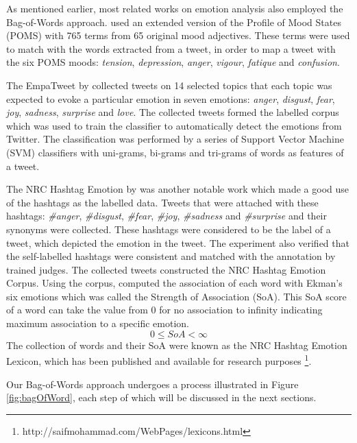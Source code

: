 As mentioned earlier, most related works on emotion analysis also employed the Bag-of-Words approach. \citet{bollen2009modeling} used an extended version of the Profile of Mood States (POMS) with 765 terms from 65 original mood adjectives. These terms were used to match with the words extracted from a tweet, in order to map a tweet with the six POMS moods: \textit{tension}, \textit{depression}, \textit{anger}, \textit{vigour}, \textit{fatique} and \textit{confusion}.

The EmpaTweet by \citet{roberts2012empatweet} collected tweets on 14 selected topics that each topic was expected to evoke a particular emotion in seven emotions: \textit{anger}, \textit{disgust}, \textit{fear}, \textit{joy}, \textit{sadness}, \textit{surprise} and \textit{love}. The collected tweets formed the labelled corpus which was used to train the classifier to automatically detect the emotions from Twitter. The classification was performed by a series of Support Vector Machine (SVM) classifiers with uni-grams, bi-grams and tri-grams of words as features of a tweet.

The NRC Hashtag Emotion by \citep{mohammad2014using} was another notable work which made a good use of the hashtags as the labelled data. Tweets that were attached with these hashtags: \textit{\#anger}, \textit{\#disgust}, \textit{\#fear}, \textit{\#joy}, \textit{\#sadness} and \textit{\#surprise} and their synonyms were collected. These hashtags were considered to be the label of a tweet, which depicted the emotion in the tweet. The experiment also verified that the self-labelled hashtags were consistent and matched with the annotation by trained judges. The collected tweets constructed the NRC Hashtag Emotion Corpus. Using the corpus, \citet{mohammad2014using} computed the association of each word with Ekman's six emotions which was called the Strength of Association (SoA). This SoA score of a word can take the value from 0 for no association to infinity indicating maximum association to a specific emotion.
\begin{equation}
	0 \leq SoA < \infty
\end{equation}
The collection of words and their SoA were known as the NRC Hashtag Emotion Lexicon, which has been published and available for research purposes \footnote{http://saifmohammad.com/WebPages/lexicons.html}. 

Our Bag-of-Words approach undergoes a process illustrated in Figure \ref{fig:bagOfWord}, each step of which will be discussed in the next sections.

